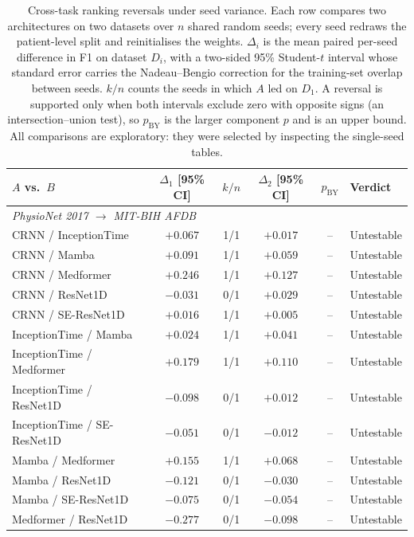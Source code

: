 \begin{table}[ht]
\centering
\caption{Cross-task ranking reversals under seed variance. Each row compares two architectures on two datasets over $n$ shared random seeds; every seed redraws the patient-level split and reinitialises the weights. $\Delta_i$ is the mean paired per-seed difference in F1 on dataset $D_i$, with a two-sided 95\% Student-$t$ interval whose standard error carries the Nadeau--Bengio correction for the training-set overlap between seeds. $k/n$ counts the seeds in which $A$ led on $D_1$. A reversal is supported only when both intervals exclude zero with opposite signs (an intersection--union test), so $p_{\mathrm{BY}}$ is the larger component $p$ and is an upper bound. All comparisons are exploratory: they were selected by inspecting the single-seed tables.}
\label{tab:flip_survival}
\small
\begin{tabular}{lccccl}
\toprule
$A$ vs.\ $B$ & $\Delta_1$ [95\% CI] & $k/n$ & $\Delta_2$ [95\% CI] & $p_{\mathrm{BY}}$ & Verdict \\
\midrule
\multicolumn{6}{l}{\textit{PhysioNet 2017 $\rightarrow$ MIT-BIH AFDB}} \\
CRNN / InceptionTime & $+0.067$ & 1/1 & $+0.017$ & -- & Untestable \\
CRNN / Mamba & $+0.091$ & 1/1 & $+0.059$ & -- & Untestable \\
CRNN / Medformer & $+0.246$ & 1/1 & $+0.127$ & -- & Untestable \\
CRNN / ResNet1D & $-0.031$ & 0/1 & $+0.029$ & -- & Untestable \\
CRNN / SE-ResNet1D & $+0.016$ & 1/1 & $+0.005$ & -- & Untestable \\
InceptionTime / Mamba & $+0.024$ & 1/1 & $+0.041$ & -- & Untestable \\
InceptionTime / Medformer & $+0.179$ & 1/1 & $+0.110$ & -- & Untestable \\
InceptionTime / ResNet1D & $-0.098$ & 0/1 & $+0.012$ & -- & Untestable \\
InceptionTime / SE-ResNet1D & $-0.051$ & 0/1 & $-0.012$ & -- & Untestable \\
Mamba / Medformer & $+0.155$ & 1/1 & $+0.068$ & -- & Untestable \\
Mamba / ResNet1D & $-0.121$ & 0/1 & $-0.030$ & -- & Untestable \\
Mamba / SE-ResNet1D & $-0.075$ & 0/1 & $-0.054$ & -- & Untestable \\
Medformer / ResNet1D & $-0.277$ & 0/1 & $-0.098$ & -- & Untestable \\

\end{tabular}
\end{table}
